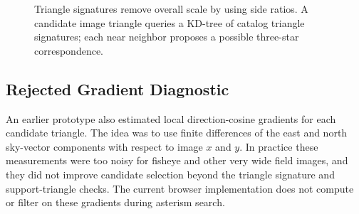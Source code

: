 \documentclass[11pt]{article}
\begin{document}
\begin{figure}[h]
\centering
{}
\caption{Triangle signatures remove overall scale by using side ratios. A
candidate image triangle queries a KD-tree of catalog triangle signatures; each
near neighbor proposes a possible three-star correspondence.}
\label{fig:triangle-signature}
\end{figure}

\subsection{Rejected Gradient Diagnostic}

An earlier prototype also estimated local direction-cosine gradients for each
candidate triangle. The idea was to use finite differences of the east and
north sky-vector components with respect to image \(x\) and \(y\). In practice
these measurements were too noisy for fisheye and other very wide field
images, and they did not improve candidate selection beyond the triangle
signature and support-triangle checks. The current browser implementation does
not compute or filter on these gradients during asterism search.
\end{document}
